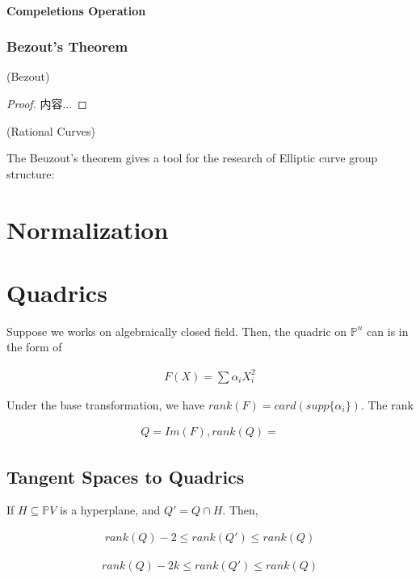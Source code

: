\documentclass[Total.tex]{subfiles}
\begin{document}
					\subsubsection{Compeletions Operation}
				
				\subsection{Bezout's Theorem}
				
				\begin{theorem}
					(Bezout)
				\end{theorem}
				
				\begin{proof}
					内容...
				\end{proof}
				
				\begin{example}
					(Rational Curves) 
				\end{example}
			
				The Beuzout's theorem gives a tool for the research of Elliptic curve group structure:
			
		
		\chapter{Normalization}
		\chapter{Quadrics}
			\label{Classical-Algebraic-Geometry-Quadrics}
			
			Suppose we works on algebraically closed field. Then, the quadric on $\mathbb{P}^n$ can is in the form of
			
			\begin{gather*}
				F(X)=\sum \alpha_i X_i^2
			\end{gather*}
			
			Under the base transformation, we have $rank(F)=card(supp\{\alpha_i\})$. The rank
			
			\begin{gather*}
				Q=Im(F),rank(Q)=
			\end{gather*}
			
			\section{Tangent Spaces to Quadrics}
			
			
			\begin{proposition}
				If $H\subseteq \mathbb{P}V$ is a hyperplane, and $Q'=Q\cap H$. Then,
				
				\begin{gather*}
					rank(Q)-2\leq rank(Q')\leq rank(Q)
				\end{gather*}
				
				\begin{gather*}
					rank(Q)-2k\leq rank(Q')\leq rank(Q)
				\end{gather*}
			\end{proposition}
			
\end{document}

